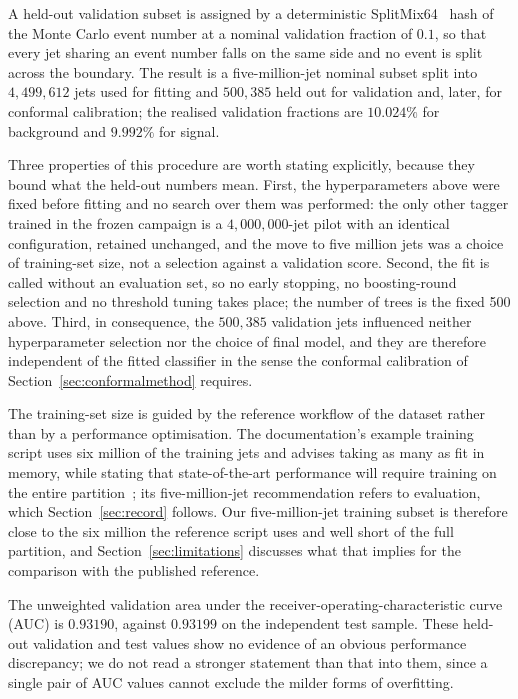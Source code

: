 \documentclass[pdflatex,sn-mathphys,Numbered,iicol]{sn-jnl}
\begin{document}
A held-out validation subset is assigned by a deterministic SplitMix64~\cite{Steele2014} hash of the
Monte Carlo event number at a nominal validation fraction of $0.1$, so that every jet
sharing an event number falls on the same side and no event is split across the
boundary. The result is a five-million-jet nominal subset split into $4{,}499{,}612$
jets used for fitting and $500{,}385$ held out for validation and, later, for conformal
calibration; the realised validation fractions are $10.024\%$ for background and
$9.992\%$ for signal.

Three properties of this procedure are worth stating explicitly, because they bound
what the held-out numbers mean. First, the hyperparameters above were fixed before
fitting and no search over them was performed: the only other tagger trained in the
frozen campaign is a $4{,}000{,}000$-jet pilot with an identical configuration, retained
unchanged, and the move to five million jets was a choice of training-set size, not a
selection against a validation score. Second, the fit is called without an evaluation
set, so no early stopping, no boosting-round selection and no threshold tuning takes
place; the number of trees is the fixed 500 above. Third, in consequence, the
$500{,}385$ validation jets influenced neither hyperparameter selection nor the choice
of final model, and they are therefore independent of the fitted classifier in the
sense the conformal calibration of Section~\ref{sec:conformalmethod} requires.

The training-set size is guided by the reference workflow of the dataset rather than
by a performance optimisation. The documentation's example training script uses six
million of the training jets and advises taking as many as fit in memory, while
stating that state-of-the-art performance will require training on the entire
partition~\cite{ATLASGitLab}; its five-million-jet recommendation refers to
evaluation, which Section~\ref{sec:record} follows. Our five-million-jet training
subset is therefore close to the six million the reference script uses and well short
of the full partition, and Section~\ref{sec:limitations} discusses what that implies for the
comparison with the published reference.

The unweighted validation area under the receiver-operating-characteristic curve (AUC)
is $0.93190$, against $0.93199$ on the independent test sample. These held-out
validation and test values show no evidence of an obvious performance discrepancy; we
do not read a stronger statement than that into them, since a single pair of AUC values
cannot exclude the milder forms of overfitting.
\end{document}
